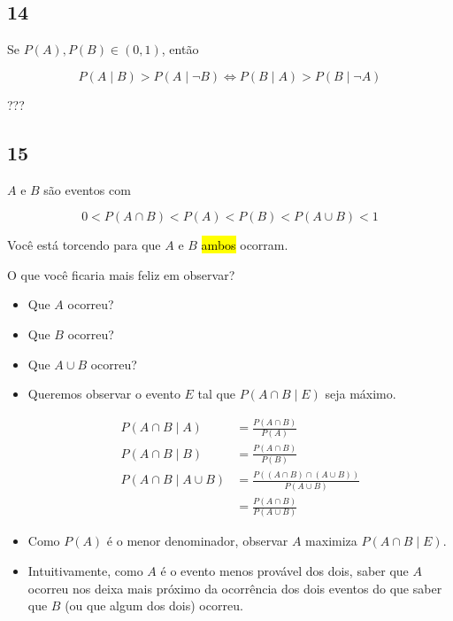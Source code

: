\documentclass[
  11pt]{report}
\begin{document}
\hypertarget{section-11}{%
\subsection*{14}\label{section-11}}

\begin{rmdbox}
Se $P(A), P(B) \in (0, 1)$, então

\[
P(A \mid B) > P(A \mid \neg B) \iff
P(B \mid A) > P(B \mid \neg A)
\]

\end{rmdbox}

???

\hypertarget{section-12}{%
\subsection*{15}\label{section-12}}

\begin{rmdbox}

$A$ e $B$ são eventos com

\[
0 < P(A \cap B) < P(A) < P(B) < P(A \cup B) < 1
\]

Você está torcendo para que $A$ e $B$ {\hl{ambos}} ocorram.

O que você ficaria mais feliz em observar?

\begin{itemize}
\item
  Que $A$ ocorreu?
\item
  Que $B$ ocorreu?
\item
  Que $A \cup B$ ocorreu?
\end{itemize}

\end{rmdbox}

\begin{itemize}
\item
  Queremos observar o evento $E$ tal que $P(A \cap B \mid E)$ seja máximo.

  \[
  \begin{aligned}
  P(A \cap B \mid A) &= \frac{P(A \cap B)}{P(A)} \\
  P(A \cap B \mid B) &= \frac{P(A \cap B)}{P(B)} \\
  P(A \cap B \mid A \cup B) &= 
    \frac{P((A \cap B) \cap (A \cup B))}{P(A \cup B)} \\
    &= \frac{P(A \cap B)}{P(A \cup B)}
  \end{aligned}
  \]
\item
  Como $P(A)$ é o menor denominador, observar $A$ maximiza $P(A \cap B \mid E)$.
\item
  Intuitivamente, como $A$ é o evento menos provável dos dois, saber que $A$ ocorreu nos deixa mais próximo da ocorrência dos dois eventos do que saber que $B$ (ou que algum dos dois) ocorreu.
\end{itemize}
\end{document}
